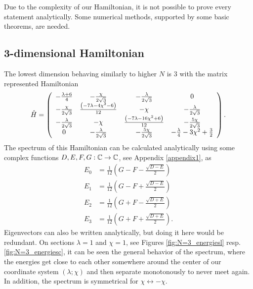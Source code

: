 Due to the complexity of our Hamiltonian, it is not possible to prove every statement analytically. Some numerical methods, supported by some basic theorems, are needed.



\subsection{3-dimensional Hamiltonian}
The lowest dimension behaving similarly to higher $N$ is 3 with the matrix represented Hamiltonian
\begin{equation}
    \hat{H}=\left(
        \begin{array}{cccc}
         -\frac{ \lambda +6}{4} & -\frac{\chi }{2 \sqrt{3}} & -\frac{\lambda }{2 \sqrt{3}} & 0 \\
         -\frac{\chi }{2 \sqrt{3}} & \frac{ \left(-7 \lambda -4 \chi ^2-6\right)}{12} & -\chi  & -\frac{\lambda }{2 \sqrt{3}} \\
         -\frac{\lambda }{2 \sqrt{3}} & -\chi  & \frac{ \left(-7 \lambda -16 \chi ^2+6\right)}{12} & -\frac{5 \chi }{2 \sqrt{3}} \\
         0 & -\frac{\lambda }{2 \sqrt{3}} & -\frac{5 \chi }{2 \sqrt{3}} & -\frac{\lambda }{4}-3 \chi ^2+\frac{3}{2} \\
        \end{array}
        \right).
\end{equation}
The spectrum of this Hamiltonian can be calculated analytically using some complex functions $D, E, F, G:\mathbb{C}\rightarrow \mathbb{C}$, see Appendix \ref{appendix1}, as
\begin{align}
        E_0 &= \frac{1}{12} \left(G-F-\frac{\sqrt{D-E}}{2}\right)
        \label{eq:N=3_en0}\\
        E_1 &= \frac{1}{12}  \left(G-F+\frac{\sqrt{D-E}}{2}\right)
        \label{eq:N=3_en1}\\
        E_2 &= \frac{1}{12} \left(G+F-\frac{\sqrt{D+E}}{2}\right)
        \label{eq:N=3_en2}\\
        E_3 &= \frac{1}{12}  \left(G+F+\frac{\sqrt{D+E}}{2}\right).
        \label{eq:N=3_en3}
\end{align}
Eigenvectors can also be written analytically, but doing it here would be redundant. On sections $\lambda=1$ and $\chi=1$, see Figures \ref{fig:N=3_energiesl} resp. \ref{fig:N=3_energiesc}, it can be seen the general behavior of the spectrum, where the energies get close to each other somewhere around the center of our coordinate system $(\lambda;\chi)$ and then separate monotonously to never meet again. In addition, the spectrum is symmetrical for $\chi\leftrightarrow -\chi$.
